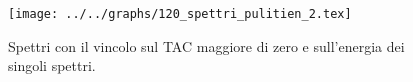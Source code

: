 \begin{figure}[h] \centering\texttt{[image: ../../graphs/120\_spettri\_pulitien\_2.tex]}\caption{Spettri con il vincolo sul TAC maggiore di zero e sull'energia dei singoli spettri. }\label{gr:120_spettri_pulitien_2} \end{figure}
